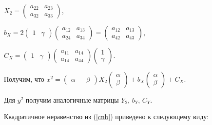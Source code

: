 \documentclass[pdftex,ptm,12pt,a4paper]{report}
\begin{document}
        $X_2 = \begin{pmatrix}
              a_{22} & a_{23} \\
              a_{32} & a_{33}
        \end{pmatrix}$,

        $b_X = 2\begin{pmatrix} 1 & \gamma \end{pmatrix}
          \begin{pmatrix}
              a_{12} & a_{13} \\
              a_{24} & a_{34}
        \end{pmatrix} =
        \begin{pmatrix}
              a_{12} & a_{13} \\
              a_{42} & a_{43}
        \end{pmatrix}$,

        $C_X = \begin{pmatrix} 1 & \gamma \end{pmatrix}
          \begin{pmatrix}
              a_{11} & a_{14} \\
              a_{14} & a_{44}
        \end{pmatrix}
        \begin{pmatrix} 1 \\ \gamma \end{pmatrix}$.

      Получим, что
      $x^2 = \begin{pmatrix} \alpha && \beta \end{pmatrix}
               X_2
             \begin{pmatrix} \alpha \\ \beta \end{pmatrix} +
             b_X \begin{pmatrix} \alpha \\ \beta \end{pmatrix}  +
             C_X$.

      Для $y^2$ получим аналогичные матрицы $Y_2$, $b_Y$, $C_Y$.

      Квадратичное неравенство из (\ref{cnb}) приведено к следующему виду:
\end{document}
